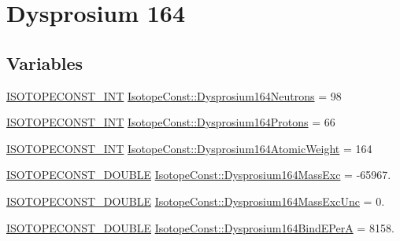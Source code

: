 \hypertarget{group___isotope_const-_dysprosium-_dy164}{}\section{Dysprosium 164}
\label{group___isotope_const-_dysprosium-_dy164}
\subsection*{Variables}
\begin{DoxyCompactItemize}
\item 
\mbox{\hyperlink{group___isotope_const-_macros_ga5f18360b3e99483a35c32d789e62621c}{I\+S\+O\+T\+O\+P\+E\+C\+O\+N\+S\+T\+\_\+\+I\+NT}} \mbox{\hyperlink{group___isotope_const-_dysprosium-_dy164_ga1d3c89d69f9d465b86d8576d812295b8}{Isotope\+Const\+::\+Dysprosium164\+Neutrons}} = 98
\item 
\mbox{\hyperlink{group___isotope_const-_macros_ga5f18360b3e99483a35c32d789e62621c}{I\+S\+O\+T\+O\+P\+E\+C\+O\+N\+S\+T\+\_\+\+I\+NT}} \mbox{\hyperlink{group___isotope_const-_dysprosium-_dy164_gabc88720a62740c7e2b446c3c9c28c34d}{Isotope\+Const\+::\+Dysprosium164\+Protons}} = 66
\item 
\mbox{\hyperlink{group___isotope_const-_macros_ga5f18360b3e99483a35c32d789e62621c}{I\+S\+O\+T\+O\+P\+E\+C\+O\+N\+S\+T\+\_\+\+I\+NT}} \mbox{\hyperlink{group___isotope_const-_dysprosium-_dy164_ga5d6ec03afa8aed1193f171b8dd6c491c}{Isotope\+Const\+::\+Dysprosium164\+Atomic\+Weight}} = 164
\item 
\mbox{\hyperlink{group___isotope_const-_macros_ga8f45a7272ce02c0b4c65c44636ed719a}{I\+S\+O\+T\+O\+P\+E\+C\+O\+N\+S\+T\+\_\+\+D\+O\+U\+B\+LE}} \mbox{\hyperlink{group___isotope_const-_dysprosium-_dy164_gacde2b968304020b3ee5f4a48900208df}{Isotope\+Const\+::\+Dysprosium164\+Mass\+Exc}} = -\/65967.
\item 
\mbox{\hyperlink{group___isotope_const-_macros_ga8f45a7272ce02c0b4c65c44636ed719a}{I\+S\+O\+T\+O\+P\+E\+C\+O\+N\+S\+T\+\_\+\+D\+O\+U\+B\+LE}} \mbox{\hyperlink{group___isotope_const-_dysprosium-_dy164_ga042e0a0763fdd218e53e966040924fb4}{Isotope\+Const\+::\+Dysprosium164\+Mass\+Exc\+Unc}} = 0.
\item 
\mbox{\hyperlink{group___isotope_const-_macros_ga8f45a7272ce02c0b4c65c44636ed719a}{I\+S\+O\+T\+O\+P\+E\+C\+O\+N\+S\+T\+\_\+\+D\+O\+U\+B\+LE}} \mbox{\hyperlink{group___isotope_const-_dysprosium-_dy164_gaa44e087047d2ed29f39a2e9ddc3bfe90}{Isotope\+Const\+::\+Dysprosium164\+Bind\+E\+PerA}} = 8158.

\end{DoxyCompactItemize}
